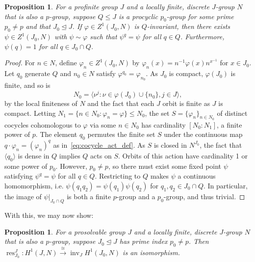 \documentclass{amsart}
\newtheorem{proposition}[theorem]{Proposition}
\theoremstyle{definition}
\theoremstyle{remark}
\numberwithin{equation}{section}
\newcommand{\iso}{\cong}
\newcommand{\normal}{\trianglelefteq}
\renewcommand{\phi}{\varphi}
\DeclareMathOperator{\inv}{inv}
\DeclareMathOperator{\res}{res}
\begin{document}
\begin{proposition}
	\label{prop:fixed_cocycle}
	For a profinite group $J$ and a locally finite, discrete $J$-group $N$ that is also a $p$-group, suppose $Q\leq J$ is a procyclic $p_0$-group for some prime $p_0\ne p$ and that $J_0 \normal J$. If $\phi \in Z^1(J_0, N)$ is $Q$-invariant, then there exists $\psi \in Z^1(J_0,N)$ with $\psi \sim \phi$ such that $\psi^q = \psi$ for all $q \in Q$. Furthermore, $\psi(q)=1$ for all $q\in J_0\cap Q$.
\end{proposition}

\begin{proof}
	For $n\in N$, define $\phi_n \in Z^1(J_0,N)$ by $\phi_n(x) = n^{-1}\phi(x)n^{x^{-1}}$ for $x \in J_0$.
	Let $q_0$ generate $Q$ and $n_0\in N$ satisfy $\phi^{q_0} = \phi_{n_0}$. As $J_0$ is compact, $\phi(J_0)$ is finite, and so is
	\begin{equation}
		N_0 = \langle \nu^j: \nu \in \phi(J_0) \cup \{n_0\}, j\in J \rangle,
	\end{equation}
	by the local finiteness of $N$ and the fact that each $J$ orbit is finite as $J$ is compact. Letting $N_1=\{n \in N_0: \phi_n = \phi\}\leq N_0$, the set $S=\{\phi_n\}_{n\in N_0}$ of distinct cocycles cohomologous to $\phi$ via some $n\in N_0$ has cardinality $[N_0:N_1]$, a finite power of $p$. The element $q_0$ permutes the finite set $S$ under the continuous map $q \cdot \phi_n= (\phi_n)^q$ as in~\eqref{eq:cocycle_act_def}. As $S$ is closed in $N^{J_0}$, the fact that $\langle q_0\rangle$ is dense in $Q$ implies $Q$ acts on $S$. Orbits of this action have cardinality 1 or some power of $p_0$. However, $p_0\ne p$, so there must exist some fixed point $\psi$ satisfying $\psi^q = \psi$ for all $q\in Q$. Restricting to $Q$ makes $\psi$ a continuous homomorphism, i.e. $\psi(q_1q_2)=\psi(q_1)\psi(q_2)$ for $q_1,q_2\in J_0 \cap Q$. In particular, the image of $\psi|_{J_0 \cap Q}$ is both a finite $p$-group and a $p_0$-group, and thus trivial.
\end{proof}

With this, we may now show:

\begin{proposition}
	\label{prop:coprime_iso}
	For a prosolvable group $J$ and a locally finite, discrete $J$-group $N$ that is also a $p$-group, suppose $J_0 \normal J$ has prime index $p_0 \ne p$. Then $\res^J_{J_0}: H^1(J, N) \xrightarrow\iso \inv_J H^1(J_0, N)$ is an isomorphism.
\end{proposition}
\end{document}
